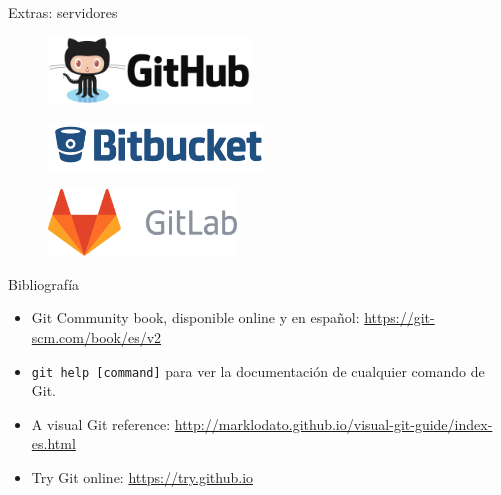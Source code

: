 \begin{frame}[t]{Extras: servidores}

    \begin{figure}[ht]
        \begin{center}
            \includegraphics[height=0.7in]{images/github.png}
        \end{center}
    \end{figure}

    \begin{figure}[ht]
        \begin{center}
            \includegraphics[height=0.5in]{images/bitbucket.png}
        \end{center}
    \end{figure}

    \begin{figure}[ht]
        \begin{center}
            \includegraphics[height=0.7in]{images/gitlab.png}
        \end{center}
    \end{figure}

\end{frame}

\begin{frame}[t]{Bibliografía}

    \begin{itemize}
        \item Git Community book, disponible online y en español: \url{https://git-scm.com/book/es/v2}
		\item \texttt{git help [command]} para ver la documentación de cualquier comando de Git.
		\item A visual Git reference: \url{http://marklodato.github.io/visual-git-guide/index-es.html}
		\item Try Git online: \url{https://try.github.io}
    \end{itemize}

\end{frame}
